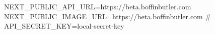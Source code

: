 NEXT_PUBLIC_API_URL=https://beta.boffinbutler.com
NEXT_PUBLIC_IMAGE_URL=https://beta.boffinbutler.com
# API_SECRET_KEY=local-secret-key
